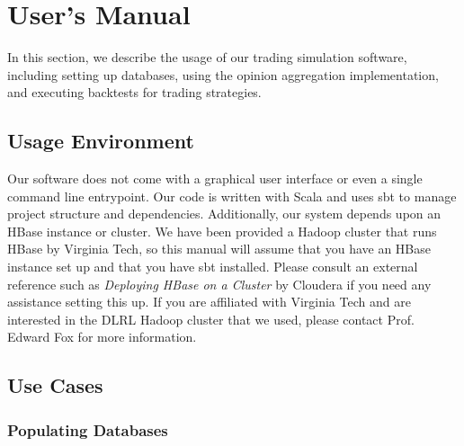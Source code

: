 \section{User's Manual}

In this section, we describe the usage of our trading simulation software, including setting up databases, using the opinion aggregation implementation, and executing backtests for trading strategies.

\subsection{Usage Environment}

Our software does not come with a graphical user interface or even a single command line entrypoint.
Our code is written with Scala \cite{scala} and uses sbt \cite{sbt} to manage project structure and dependencies.
Additionally, our system depends upon an HBase \cite{hbase} instance or cluster.
We have been provided a Hadoop cluster that runs HBase by Virginia Tech, so this manual will assume that you have an HBase instance set up and that you have sbt installed.
Please consult an external reference such as \textit{Deploying HBase on a Cluster} by Cloudera \cite{clouderaHbaseDeploy} if you need any assistance setting this up.
If you are affiliated with Virginia Tech and are interested in the DLRL Hadoop cluster that we used, please contact Prof. Edward Fox for more information.

\subsection{Use Cases}

\subsubsection{Populating Databases}

